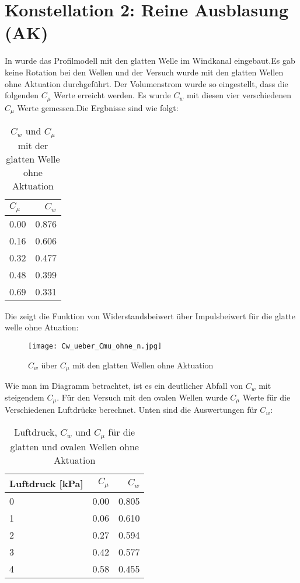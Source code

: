 \section{Konstellation 2: Reine Ausblasung (AK)}
\label{s:reineAusblasung}
In  wurde das Profilmodell mit den glatten Welle im Windkanal eingebaut.Es gab keine Rotation bei den Wellen und der Versuch wurde mit den glatten Wellen ohne Aktuation durchgef\"uhrt. Der Volumenstrom wurde so eingestellt, dass
die folgenden $C_{\mu}$  Werte erreicht werden. Es wurde $C_{w}$ mit diesen vier verschiedenen $C_{\mu}$ Werte gemessen.Die Ergbnisse sind wie folgt:
\begin{table}[H]
	\centering
	\begin{tabular}{lr}
		\toprule
		$C_{\mu}$ & $C_{w}$ \\
		\midrule
		0.00 & 0.876\\
		0.16 & 0.606\\
		0.32 & 0.477\\
		0.48 & 0.399\\
		0.69 & 0.331\\
		\bottomrule
	\end{tabular}
	\caption{$C_{w}$ und $C_{\mu}$ mit der glatten Welle ohne Aktuation }
	\label{tab:Cw-Cmu_Kon1}
\end{table}


Die  zeigt die Funktion von Widerstandsbeiwert \"uber Impulsbeiwert f\"ur die glatte welle ohne Atuation:
\begin{figure}[h]
	\centering
	\texttt{[image: Cw\_ueber\_Cmu\_ohne\_n.jpg]}
	\caption{$C_{w}$  \"uber $C_{\mu}$ mit den glatten Wellen ohne Aktuation }
	\label{fig:Cw-Cmu_Konf1}
\end{figure}

Wie man im Diagramm betrachtet, ist es ein deutlicher Abfall von $C_{w}$ mit steigendem $C_{\mu}$.
F\"ur den Versuch mit den ovalen Wellen wurde $C_{\mu}$ Werte f\"ur die Verschiedenen Luftdr\"ucke berechnet. Unten sind die Auswertungen f\"ur $C_{w}$:
 
\begin{table}[h]
	\centering
	\begin{tabular}{lrr}
		\toprule
		Luftdruck [kPa] & $C_{\mu}$ & $C_{w}$ \\
		\midrule
		0 & 0.00 & 0.805\\
		1 & 0.06 & 0.610\\
		2 & 0.27 & 0.594\\
		3 & 0.42 & 0.577\\
		4 & 0.58 & 0.455\\
		\bottomrule
	\end{tabular}\\
	\caption{Luftdruck, $C_{w}$  und $C_{\mu}$ f\"ur die glatten und ovalen Wellen ohne Aktuation}
	\label{tab:Cw-Cmu_Konf1+2}
\end{table}

